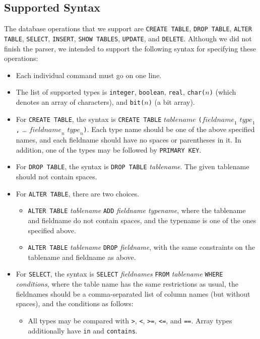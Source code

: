 \documentclass[10pt]{article}
\begin{document}
\begin{multicols}{2}
\subsection{Supported Syntax}
\label{simplifying_parsing_assumptions}
The database operations that we support are \texttt{CREATE TABLE}, \texttt{DROP TABLE}, \texttt{ALTER TABLE}, \texttt{SELECT}, \texttt{INSERT}, \texttt{SHOW TABLES}, \texttt{UPDATE}, and \texttt{DELETE}. Although we did not finish the parser, we intended to support the following syntax for specifying these operations:
\begin{itemize}
	\item Each individual command must go on one line.
	\item The list of supported types is \verb+integer+, \verb+boolean+, \verb+real+, \verb+char(+$n$\verb+)+ (which denotes an array of characters), and \verb+bit(+$n$\verb+)+ (a bit array).
	\item For \texttt{CREATE TABLE}, the syntax is \texttt{CREATE TABLE} $\mathit{tablename}$ \verb+(+$\mathit{fieldname}_1$ $\mathit{type}_1$\verb+,+ \dots{} $\mathit{fieldname}_n$ $\mathit{type}_n$\verb+)+. Each type name should be one of the above specified names, and each fieldname should have no spaces or parentheses in it. In addition, one of the types may be followed by \texttt{PRIMARY KEY}.
	\item For \texttt{DROP TABLE}, the syntax is \verb+DROP TABLE+ \textit{tablename}. The given tablename should not contain spaces.
	\item For \texttt{ALTER TABLE}, there are two choices.
	\begin{itemize}
		\item \texttt{ALTER TABLE} \textit{tablename} \texttt{ADD} \textit{fieldname typename}, where the tablename and fieldname do not contain spaces, and the typename is one of the ones specified above.
		\item \texttt{ALTER TABLE} \textit{tablename} \texttt{DROP} \textit{fieldname}, with the same constraints on the tablename and fieldname as above.
	\end{itemize}
	\item For \texttt{SELECT}, the syntax is \texttt{SELECT} \textit{fieldnames} \texttt{FROM} \textit{tablename} \texttt{WHERE} \textit{conditions}, where the table name has the same restrictions as usual, the fieldnames should be a comma-separated list of column names (but without spaces), and the conditions as follows:
	\begin{itemize}
		\item All types may be compared with \verb+>+, \verb+<+, \verb+>=+, \verb+<=+, and \verb+==+. Array types additionally have \verb+in+ and \verb+contains+.

\end{itemize}
\end{itemize}
\end{multicols}
\end{document}
